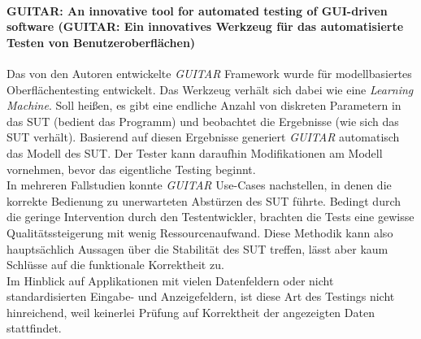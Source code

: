 \paragraph{GUITAR: An innovative tool for automated testing of GUI-driven software  \cite{nguyen_guitar:_2014} (GUITAR: Ein innovatives Werkzeug für das automatisierte Testen von Benutzeroberflächen)} Das von den Autoren entwickelte \textit{GUITAR} Framework wurde für modellbasiertes Oberflächentesting entwickelt. Das Werkzeug verhält sich dabei wie eine \textit{Learning Machine}. Soll heißen, es gibt eine endliche Anzahl von diskreten Parametern in das \Gls{SUT} (bedient das Programm) und beobachtet die Ergebnisse (wie sich das \Gls{SUT} verhält). Basierend auf diesen Ergebnisse generiert \textit{GUITAR} automatisch das Modell des SUT. Der Tester kann daraufhin Modifikationen am Modell vornehmen, bevor das eigentliche Testing beginnt.\\ 
In mehreren Fallstudien konnte \textit{GUITAR} Use-Cases nachstellen, in denen die korrekte Bedienung zu unerwarteten Abstürzen des \Gls{SUT} führte. Bedingt durch die geringe Intervention durch den Testentwickler, brachten die Tests eine gewisse Qualitätssteigerung mit wenig Ressourcenaufwand. Diese Methodik kann also hauptsächlich Aussagen über die Stabilität des \Gls{SUT} treffen, lässt aber kaum Schlüsse auf die funktionale Korrektheit zu.\\
Im Hinblick auf Applikationen mit vielen Datenfeldern oder nicht standardisierten Eingabe- und Anzeigefeldern, ist diese Art des Testings nicht hinreichend, weil keinerlei Prüfung auf Korrektheit der angezeigten Daten stattfindet.

